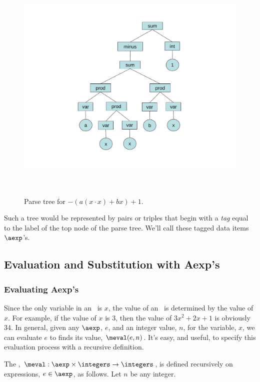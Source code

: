 \begin{definition}
\begin{figure}[htbp]
\centering \includegraphics[height=4.5in]{figures/parsetree.pdf}
\caption{Parse tree for $-(a(x\cdot x)+ bx) + 1$.}
\label{fig:parse}
\end{figure}


Such a tree would be represented by pairs or triples that begin with a
\emph{tag} equal to the label of the top node of the parse tree.  We'll
call these tagged data items $\aexp$'s.  
\fi


\subsection{Evaluation and Substitution with Aexp's}

\subsubsection{Evaluating Aexp's}

Since the only variable in an \aexp\ is $x$, the value of an \aexp\ is
determined by the value of $x$.  For example, if the value of $x$ is 3,
then the value of $3x^2 + 2x + 1$ is obviously 34.  In general, given any
$\aexp$, $e$, and an integer value, $n$, for the variable, $x$, we can
evaluate $e$ to finds its value, $\meval(e,n)$.  It's easy, and useful, to
specify this evaluation process with a recursive definition.

\begin{definition}\label{meval-def}
  The , $\meval: \aexp \times \integers \to
  \integers$, is defined recursively on expressions, $e \in \aexp$, as
  follows.  Let $n$ be any integer.


\end{definition}
\end{definition}
